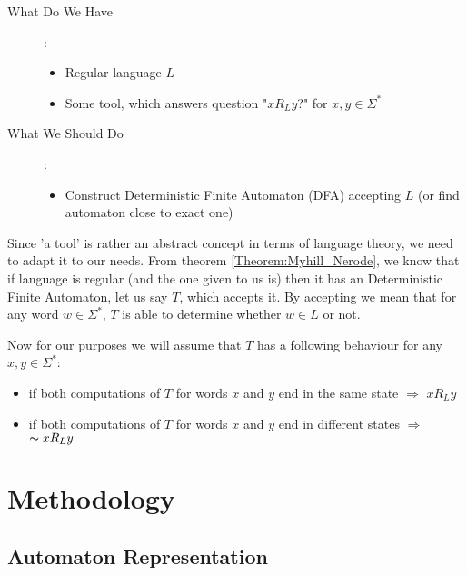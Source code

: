 \documentclass[runningheads,a4paper]{llncs}
\begin{document}
\begin{description}
  \item[What Do We Have]: 
   	\begin{itemize}
		\item Regular language $L$
		\item Some tool, which answers question "$x R_{L} y$?" for $x,y \in \Sigma^{*}$
	\end{itemize}
  \item[What We Should Do]:
    \begin{itemize}
		\item Construct Deterministic Finite Automaton (DFA) accepting $L$ (or find automaton close to exact one)
	\end{itemize}
 \end{description}


Since 'a tool' is rather an abstract concept in terms of language theory, we need to adapt it to our needs. From theorem \ref{Theorem:Myhill_Nerode}, we know that if language is regular (and the one given to us is) then it has an Deterministic Finite Automaton, let us say $T$, which accepts it. By accepting we mean that for any word $w \in \Sigma^{*}$, $T$ is able to determine whether $w \in L$ or not. 

Now for our purposes we will assume that $T$ has a following behaviour for any $x,y \in \Sigma^{*}$:
\begin{itemize}
  \item if both computations of $T$ for words $x$ and $y$ end in the same state $\Rightarrow$ $x R_{L} y$
  \item if both computations of $T$ for words $x$ and $y$ end in different states $\Rightarrow$ $\thicksim x R_{L} y$
\end{itemize}



\section{Methodology} \label{section:methodology}

\subsection{Automaton Representation} \label{sec:autom}
\end{document}
